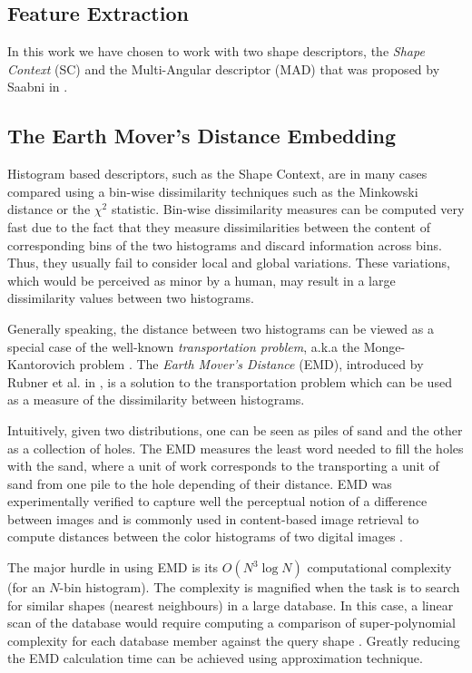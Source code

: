 \documentclass[10pt, conference, compsocconf]{IEEEtran}
\theoremstyle{definition}
\begin{document}
\subsection{Feature Extraction}
In this work we have chosen to work with two shape descriptors, the \emph{Shape Context} (SC) \cite{belongie2002shape} and the Multi-Angular descriptor (MAD) that was proposed by Saabni in \cite{saabni2013multi}.

\subsection{The Earth Mover's Distance Embedding}
Histogram based descriptors, such as the Shape Context, are in many cases compared using a bin-wise dissimilarity techniques such as the Minkowski distance or the $\chi^2$ statistic.
Bin-wise dissimilarity measures can be computed very fast due to the fact that they measure dissimilarities between the content of corresponding bins of the two histograms and discard information across bins. 
Thus, they usually fail to consider local and global variations. 
These variations, which would be perceived as minor by a human, may result in a large dissimilarity values between two histograms. 

Generally speaking, the distance between two histograms can be viewed as a special case of the well-known \emph{transportation problem}, a.k.a the Monge-Kantorovich problem \cite{rachev1985monge}.
The \emph{Earth Mover's Distance} (EMD), introduced by Rubner et al. in \cite{rubner2000earth}, is a solution to the transportation problem which can be used as a measure of the dissimilarity between histograms. 

{Intuitively, given two distributions, one can be seen as piles of sand and the other as a collection of holes. 
The EMD measures the least word needed to fill the holes with the sand, where a unit of work corresponds to the transporting a unit of sand from one pile to the hole depending of their distance.}
EMD was experimentally verified to capture well the perceptual notion of a difference between images and is commonly used in content-based image retrieval to compute distances between the color histograms of two digital images \cite{grauman2004fast}.

The major hurdle in using EMD is its $O\left( {{N^3}\log N} \right)$ computational complexity (for an $N$-bin histogram). The complexity is magnified when the task is to search for similar shapes (nearest neighbours) in a large database. 
In this case, a linear scan of the database would require computing a comparison of super-polynomial complexity for each database member against the query shape \cite{grauman2004fast}. 
Greatly reducing the EMD calculation time can be achieved using approximation technique.  
\end{document}
